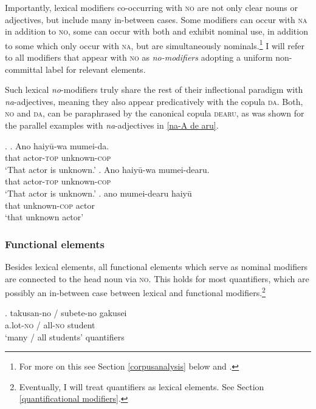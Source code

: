 Importantly, lexical modifiers co-occurring with \textsc{no} are not only clear nouns or adjectives, but include many in-between cases. Some modifiers can occur with \textsc{na} in addition to \textsc{no}, some can occur with both and exhibit nominal use, in addition to some which only occur with \textsc{na}, but are simultaneously nominals.\footnote{For more on this see Section \ref{corpusanalysis} below and \citet{kohlich:2023:suppl}.} I will refer to all modifiers that appear with \textsc{no} as \textit{\textit{no}-modifiers} adopting a uniform non-committal label for relevant elements.

Such lexical \textit{no}-modifiers truly share the rest of their inflectional paradigm with \textit{na}-adjectives, meaning they also appear predicatively with the copula \textsc{da}. Both, \textsc{no} and \textsc{da}, can be paraphrased by the canonical copula \textsc{dearu}, as was shown for the parallel examples with \textit{na}-adjectives in \ref{na-A de aru}.

\ex. \ag. Ano haiyū-wa mumei-da.\\
that actor-\textsc{top} unknown-\textsc{cop}\\
`That actor is unknown.’
\bg. Ano haiyū-wa mumei-dearu.\\
that actor-\textsc{top} unknown-\textsc{cop}\\
`That actor is unknown.’
\cg. ano mumei-dearu haiyū\\
that unknown-\textsc{cop} actor\\
`that unknown actor’

\subsubsection{Functional elements} \label{grammatical no}

Besides lexical elements, all functional elements which serve as nominal modifiers are connected to the head noun via \textsc{no}. This holds for most quantifiers, which are possibly an in-between case between lexical and functional modifiers.\footnote{Eventually, I will treat quantifiers as lexical elements. See Section \ref{quantificational modifiers}.}

\exg. takusan-no / subete-no gakusei\\
a.lot-\textsc{no} / all-\textsc{no} student\\
`many / all students' \hfill \null quantifiers


